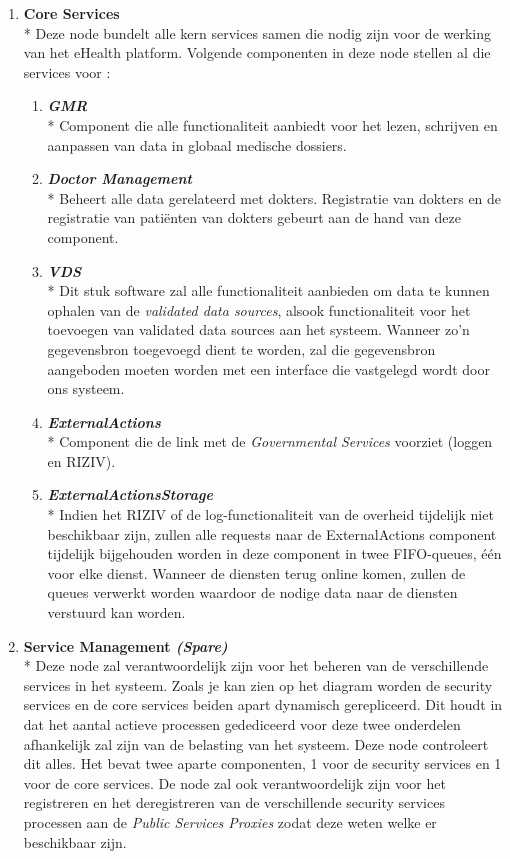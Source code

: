 \documentclass[a4paper,10pt]{article}
\begin{document}
\begin{enumerate}
\item \textbf{Core Services}\\*
Deze node bundelt alle kern services samen die nodig zijn voor de werking van het eHealth platform. Volgende componenten in deze node stellen al die services voor : 
\begin{enumerate}
 \item \textit{\textbf{GMR}}\\*
Component die alle functionaliteit aanbiedt voor het lezen, schrijven en aanpassen van data in globaal medische dossiers.
\item \textit{\textbf{Doctor Management}}\\*
Beheert alle data gerelateerd met dokters. Registratie van dokters en de registratie van patiënten van dokters gebeurt aan de hand van deze component.
\item \textit{\textbf{VDS}}\\*
Dit stuk software zal alle functionaliteit aanbieden om data te kunnen ophalen van de \textit{validated data sources}, alsook functionaliteit voor het toevoegen van validated data sources aan het systeem. Wanneer zo'n gegevensbron toegevoegd dient te worden, zal die gegevensbron aangeboden moeten worden met een interface die vastgelegd wordt door ons systeem. 
\item \textit{\textbf{ExternalActions}}\\*
Component die de link met de \textit{Governmental Services} voorziet (loggen en RIZIV).
\item \textit{\textbf{ExternalActionsStorage}}\\*
Indien het RIZIV of de log-functionaliteit van de overheid tijdelijk niet beschikbaar zijn, zullen alle requests naar de ExternalActions component tijdelijk bijgehouden worden in deze component in twee FIFO-queues, één voor elke dienst. Wanneer de diensten terug online komen, zullen de queues verwerkt worden waardoor de nodige data naar de diensten verstuurd kan worden.
\end{enumerate}

\item \textbf{Service Management \textit{(Spare)}}\\*
Deze node zal verantwoordelijk zijn voor het beheren van de verschillende services in het systeem. Zoals je kan zien op het diagram worden de security services en de core services beiden apart dynamisch gerepliceerd. Dit houdt in dat het aantal actieve processen gedediceerd voor deze twee onderdelen afhankelijk zal zijn van de belasting van het systeem. Deze node controleert dit alles. Het bevat twee aparte componenten, 1 voor de security services en 1 voor de core services. De node zal ook verantwoordelijk zijn voor het registreren en het deregistreren van de verschillende security services processen aan de \textit{Public Services Proxies} zodat deze weten welke er beschikbaar zijn.

\end{enumerate}
\end{document}
